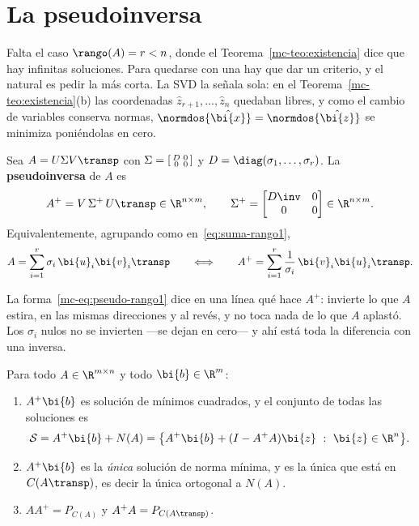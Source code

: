 \section{La pseudoinversa}\label{mc-sec:pseudo}

Falta el caso $\rango(A)=r<n$, donde el Teorema~\ref{mc-teo:existencia} dice
que hay infinitas soluciones. Para quedarse con una hay que dar un criterio, y
el natural es pedir la más corta. La SVD la señala sola: en el
Teorema~\ref{mc-teo:existencia}(b) las coordenadas $\hat z_{r+1},\dots,\hat z_n$
quedaban libres, y como el cambio de variables conserva normas,
$\normdos{\hat{\bi{x}}}=\normdos{\hat{\bi{z}}}$ se minimiza poniéndolas en
cero.

\begin{definition}\label{mc-def:pseudo}
Sea $A=U\Sigma V\transp$ con $\Sigma=\begin{bsmallmatrix}D&0\\ 0&0\end{bsmallmatrix}$
y $D=\diag(\sigma_1,\dots,\sigma_r)$. La \textbf{pseudoinversa} de $A$ es
\[
A^{+}=V\,\Sigma^{+}\,U\transp\in\R^{n\times m},
\qquad
\Sigma^{+}=\begin{bmatrix}D\inv&0\\ 0&0\end{bmatrix}\in\R^{n\times m} .
\]
Equivalentemente, agrupando como en~\eqref{eq:suma-rango1},
\begin{equation}\label{mc-eq:pseudo-rango1}
A=\sum_{i=1}^{r}\sigma_i\,\bi{u}_i\bi{v}_i\transp
\qquad\Longleftrightarrow\qquad
A^{+}=\sum_{i=1}^{r}\frac{1}{\sigma_i}\,\bi{v}_i\bi{u}_i\transp .
\end{equation}
\end{definition}

La forma~\eqref{mc-eq:pseudo-rango1} dice en una línea qué hace $A^{+}$:
invierte lo que $A$ estira, en las mismas direcciones y al revés, y no toca
nada de lo que $A$ aplastó. Los $\sigma_i$ nulos no se invierten ---se dejan
en cero--- y ahí está toda la diferencia con una inversa.

\begin{theorem}\label{mc-teo:pseudo}
Para todo $A\in\R^{m\times n}$ y todo $\bi{b}\in\R^m$:
\begin{enumerate}[label=\textup{(\alph*)},leftmargin=*]
\item $A^{+}\bi{b}$ es solución de mínimos cuadrados, y el conjunto de todas
las soluciones es
\[
\mathcal S=A^{+}\bi{b}+N(A)=\bigl\{A^{+}\bi{b}+(I-A^{+}A)\bi{z}\ :\ \bi{z}\in\R^n\bigr\} .
\]
\item $A^{+}\bi{b}$ es la \emph{única} solución de norma mínima, y es la única
que está en $C(A\transp)$, es decir la única ortogonal a $N(A)$.
\item $AA^{+}=P_{C(A)}$ y $A^{+}A=P_{C(A\transp)}$.
\end{enumerate}
\end{theorem}

